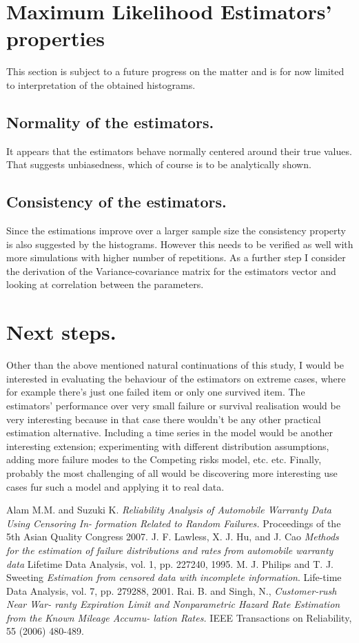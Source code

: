 \documentclass{article}
\begin{document}
\section{Maximum Likelihood Estimators' properties}
This section is subject to a future progress on the matter and is for now limited to interpretation of the obtained histograms.
\subsection{Normality of the estimators.} It appears that the estimators behave normally centered around their true values. That suggests unbiasedness, which of course is to be analytically shown.  \\
\subsection{Consistency of the estimators.} Since the estimations improve over a larger sample size the consistency property is also suggested by the histograms. However this needs to be verified as well with more simulations with higher number of repetitions. As a further step I consider the derivation of the Variance-covariance matrix for the estimators vector and looking at correlation between the parameters.
\section{Next steps.}
Other than the above mentioned natural continuations of this study, I would be interested in evaluating the behaviour of the estimators on extreme cases, where for example there's just one failed item or only one survived item. The estimators' performance over very small failure or survival realisation would be very interesting because in that case there wouldn't be any other practical estimation alternative. Including a time series in the model would be another interesting extension; experimenting with different distribution assumptions, adding more failure modes to the Competing risks model, etc. etc. Finally, probably the most challenging of all would be discovering more interesting use cases fur such a model and applying it to real data.
\begin{thebibliography}{9}
  Alam M.M. and Suzuki K.
  \emph{Reliability Analysis of Automobile Warranty Data Using Censoring In- formation Related to Random Failures.} 
  Proceedings of the 5th Asian Quality Congress 2007.
  J. F. Lawless, X. J. Hu, and J. Cao
  \emph{Methods for the estimation of failure distributions and rates from automobile warranty data}
  Lifetime Data Analysis, vol. 1, pp. 227240, 1995. 
  M. J. Philips and T. J. Sweeting
  \emph{Estimation from censored data with incomplete information}.
  Life-time Data Analysis, vol. 7, pp. 279288, 2001.
  Rai. B. and Singh, N., 
  \emph{Customer-rush Near War- ranty Expiration Limit and Nonparametric Hazard Rate Estimation from the Known Mileage Accumu- lation Rates.}
  IEEE Transactions on Reliability, 55 (2006) 480-489.
\end{thebibliography}
\end{document}
